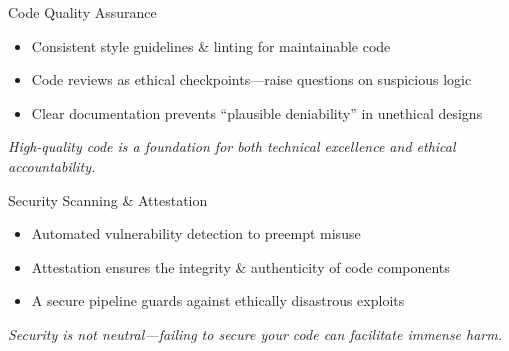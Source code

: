 \documentclass[aspectratio=169]{beamer}
\begin{document}
%
%
\begin{frame}{Code Quality Assurance}
\begin{itemize}
\item Consistent style guidelines \& linting for maintainable code
\item Code reviews as ethical checkpoints—raise questions on suspicious logic
\item Clear documentation prevents “plausible deniability” in unethical designs
\end{itemize}

\vspace{0.8em}
\emph{High-quality code is a foundation for both technical excellence and ethical accountability.}
\end{frame}

%
\begin{frame}{Security Scanning \& Attestation}
\begin{itemize}
\item Automated vulnerability detection to preempt misuse
\item Attestation ensures the integrity \& authenticity of code components
\item A secure pipeline guards against ethically disastrous exploits
\end{itemize}

\vspace{0.8em}
\emph{Security is not neutral—failing to secure your code can facilitate immense harm.}
\end{frame}
\end{document}
